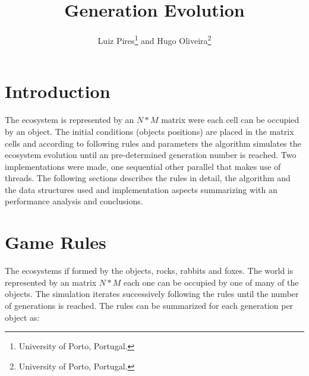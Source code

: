 \documentclass[10pt,a4paper,final]{report}
\begin{document}
\title{\LARGE \bf
 Generation Evolution
}


\author{Luiz Pires\footnote{University of Porto, Portugal.} and Hugo Oliveira\footnote{University of Porto, Portugal.}}
\maketitle

\section{Introduction}
The ecosystem is represented by an $N*M$ matrix were each cell can be occupied by an object. The initial conditions (objects positions) are placed in the matrix cells and according to following rules and parameters the algorithm simulates the ecosystem evolution until an pre-determined generation number is reached.
Two implementations were made, one sequential other parallel that makes use of threads.
The following sections describes the rules in detail, the algorithm and the data structures used and implementation aspects summarizing with an performance analysis and conclusions. 



\section{Game Rules}
 The ecosystems if formed by the objects, rocks, rabbits and foxes. The world is represented by an matrix $N*M$ each one can be occupied by one of many of the objects. The simulation iterates successively following the rules until the number of generations is reached. The rules can be summarized for each generation per object as:
 
\end{document}
